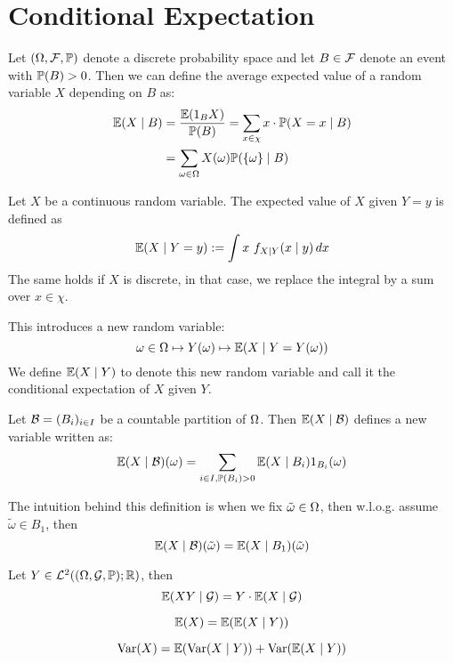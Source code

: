 \section{Conditional Expectation}
\begin{ddefinition*}
  Let \((\O, \F, \P)\) denote a discrete probability space and let \(B \in \F\) denote an event with \(\P(B) > 0\). Then we can define the average expected value of a random variable \(X\) depending on \(B\) as:
  \begin{align*}
    \E(X \mid B) &= \frac{\E(\I_B X)}{\P(B)} = \sum_{x \in \chi} x \cdot \P(X = x \mid B) \\
    &= \sum_{\omega \in \O} X(\omega) \P(\{\omega\} \mid B)
  \end{align*}
\end{ddefinition*}

\begin{cdefinition*}
  Let \(X\) be a continuous random variable. The expected value of \(X\) given \(Y = y\) is defined as
  \[\E(X \mid Y = y) := \int x \ f_{X \mid Y}(x \mid y) \,dx\]
  The same holds if \(X\) is discrete, in that case, we replace the integral by a sum over \(x \in \chi\).
\end{cdefinition*}

This introduces a new random variable:
\[\omega \in \O \mapsto Y(\omega) \mapsto \E(X \mid Y = Y(\omega))\]
We define \(\E(X \mid Y)\) to denote this new random variable and call it the conditional expectation of \(X\) given \(Y\).

\begin{ddefinition*}
  Let \(\B = (B_i)_{i \in I}\) be a countable partition of \(\O\). Then \(\E(X \mid \B)\) defines a new variable written as:
  \[\E(X \mid \B)(\omega) = \sum_{i \in I, \P(B_i) > 0} \E(X \mid B_i) \I_{B_i}(\omega)\]
\end{ddefinition*}

The intuition behind this definition is when we fix \(\tilde{\omega} \in \O\), then w.l.o.g. assume \(\tilde{\omega} \in B_1\), then
\[\E(X \mid \B)(\tilde{\omega}) = \E(X \mid B_1)(\tilde{\omega})\]

\begin{dtheorem*}
  Let \(Y \in \L^2((\O, \mathcal{G}, \P); \R)\), then
  \[\E(XY \mid \mathcal{G}) = Y \cdot \E(X \mid \mathcal{G})\]
\end{dtheorem*}

\begin{theorem*}
  \[\E(X) = \E(\E(X \mid Y))\]
\end{theorem*}

\begin{theorem*}
  \[\Var(X) = \E(\Var(X \mid Y)) + \Var(\E(X \mid Y))\]
\end{theorem*}
